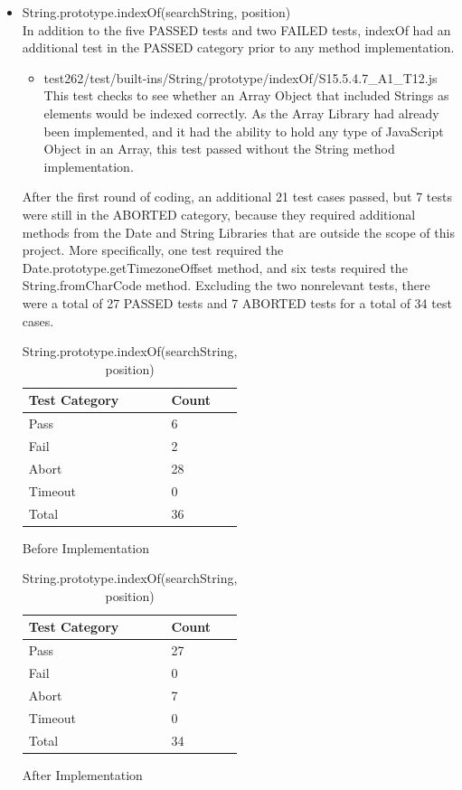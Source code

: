 \documentclass[a4paper,11pt,twoside]{report}
\begin{document}
\begin{itemize}
\item String.prototype.indexOf(searchString, position) \\
In addition to the five PASSED tests and two FAILED tests, indexOf had an additional test in the PASSED category prior to any method implementation.
\begin{itemize}
\item test262/test/built-ins/String/prototype/indexOf/S15.5.4.7\_A1\_T12.js \\
This test checks to see whether an Array Object that included Strings as elements would be indexed correctly. As the Array Library had already been implemented, and it had the ability to hold any type of JavaScript Object in an Array, this test passed without the String method implementation.
\end{itemize}
After the first round of coding, an additional 21 test cases passed, but 7 tests were still in the ABORTED category, because they required additional methods from the Date and String Libraries that are outside the scope of this project. More specifically, one test required the Date.prototype.getTimezoneOffset method, and six tests required the String.fromCharCode method. Excluding the two nonrelevant tests, there were a total of 27 PASSED tests and 7 ABORTED tests for a total of 34 test cases.
\begin{table}[ht!]
\centering
\begin{subtable}{0.5\textwidth}
\centering
\begin{tabular}{|p{3cm}|p{2cm}|} \hline
\textbf{Test Category} & \textbf{Count} \\ \hline
Pass & 6 \\
Fail & 2 \\
Abort & 28 \\
Timeout & 0 \\
Total & 36 \\ \hline
\end{tabular}
\caption{Before Implementation}
\end{subtable}%
\begin{subtable}{0.5\textwidth}
\centering
\begin{tabular}{|p{3cm}|p{2cm}|} \hline
\textbf{Test Category} & \textbf{Count} \\ \hline
Pass & 27 \\
Fail & 0 \\
Abort & 7 \\
Timeout & 0 \\
Total & 34 \\ \hline
\end{tabular}
\caption{After Implementation}
\end{subtable}
\caption{String.prototype.indexOf(searchString, position)}
\end{table}


\end{itemize}
\end{document}
